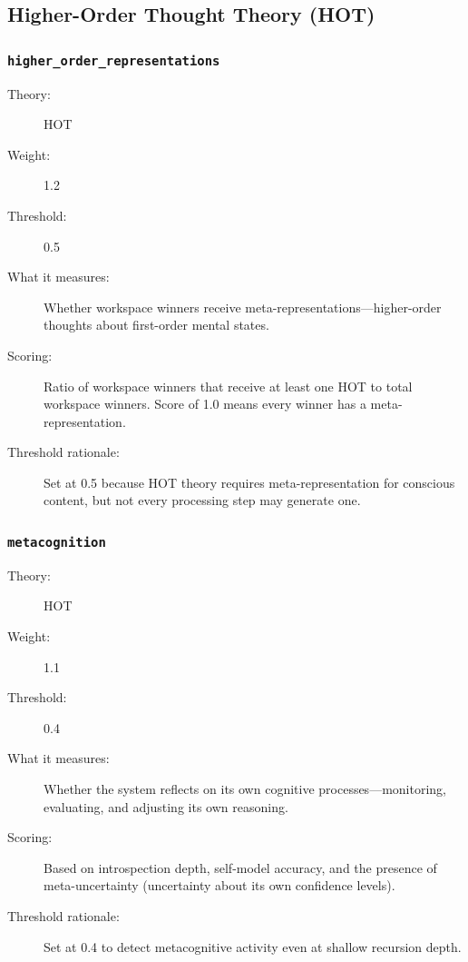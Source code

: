 \subsection{Higher-Order Thought Theory (HOT)}

\subsubsection{\texttt{higher\_order\_representations}}
\begin{description}
  \item[Theory:] HOT \cite{rosenthal2005}
  \item[Weight:] 1.2
  \item[Threshold:] 0.5
  \item[What it measures:] Whether workspace winners receive meta-representations---higher-order thoughts about first-order mental states.
  \item[Scoring:] Ratio of workspace winners that receive at least one HOT to total workspace winners. Score of 1.0 means every winner has a meta-representation.
  \item[Threshold rationale:] Set at 0.5 because HOT theory requires meta-representation for conscious content, but not every processing step may generate one.
\end{description}

\subsubsection{\texttt{metacognition}}
\begin{description}
  \item[Theory:] HOT
  \item[Weight:] 1.1
  \item[Threshold:] 0.4
  \item[What it measures:] Whether the system reflects on its own cognitive processes---monitoring, evaluating, and adjusting its own reasoning.
  \item[Scoring:] Based on introspection depth, self-model accuracy, and the presence of meta-uncertainty (uncertainty about its own confidence levels).
  \item[Threshold rationale:] Set at 0.4 to detect metacognitive activity even at shallow recursion depth.
\end{description}

